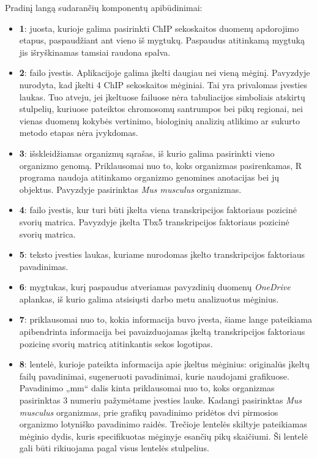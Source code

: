 \documentclass[12pt]{article}
\begin{document}
Pradinį langą sudarančių komponentų apibūdinimai:
\begin{itemize}
    \item \textbf{\large{1}}: juosta, kurioje galima pasirinkti ChIP
        sekoskaitos duomenų apdorojimo etapus, paspaudžiant ant vieno iš
        mygtukų. Paspaudus atitinkamą mygtuką jis išryškinamas tamsiai raudona
        spalva.
    \item \textbf{\large{2}}: failo įvestis. Aplikacijoje galima įkelti daugiau
        nei vieną mėginį. Pavyzdyje nurodyta, kad įkelti 4 ChIP sekoskaitos
        mėginiai. Tai yra privalomas įvesties laukas. Tuo atveju, jei
        įkeltuose failuose nėra tabuliacijos simboliais atskirtų stulpelių,
        kuriuose pateiktos chromosomų santrumpos bei pikų regionai, nei vienas
        duomenų kokybės vertinimo, biologinių analizių atlikimo ar sukurto
        metodo etapas nėra įvykdomas.
    \item \textbf{\large{3}}: išskleidžiamas organizmų sąrašas, iš kurio
        galima pasirinkti vieno organizmo genomą. Priklausomai nuo to, koks
        organizmas pasirenkamas, R programa naudoja atitinkamo organizmo
        genomines anotacijas bei jų objektus. Pavyzdyje pasirinktas
        \emph{Mus musculus} organizmas.
    \item \textbf{\large{4}}: failo įvestis, kur turi būti įkelta viena
        transkripcijos faktoriaus pozicinė svorių matrica. Pavyzdyje įkelta
        Tbx5 transkripcijos faktoriaus pozicinė svorių matrica.
    \item \textbf{\large{5}}: teksto įvesties laukas, kuriame nurodomas
        įkelto transkripcijos faktoriaus pavadinimas.
    \item \textbf{\large{6}}: mygtukas, kurį paspaudus atveriamas pavyzdinių
        duomenų \emph{OneDrive} aplankas, iš kurio galima atsisiųsti darbo
        metu analizuotus mėginius.
    \item \textbf{\large{7}}: priklausomai nuo to, kokia informacija buvo
        įvesta, šiame lange pateikiama apibendrinta informacija bei
        pavaizduojamas įkeltą transkripcijos faktoriaus pozicinę svorių
        matricą atitinkantis sekos logotipas.
    \item \textbf{\large{8}}: lentelė, kurioje pateikta informacija apie įkeltus
        mėginius: originalūs įkeltų failų pavadinimai, sugeneruoti pavadinimai,
        kurie naudojami grafikuose. Pavadinimo „mm“ dalis kinta priklausomai
        nuo to, koks organizmas pasirinktas 3 numeriu pažymėtame įvesties
        lauke. Kadangi pasirinktas \emph{Mus musculus} organizmas, prie grafikų
        pavadinimo pridėtos dvi pirmosios organizmo lotyniško pavadinimo raidės.
        Trečioje lentelės skiltyje pateikiamas mėginio dydis, kuris
        specifikuotas mėginyje esančių pikų skaičiumi. Ši lentelė gali būti
        rikiuojama pagal visus lentelės stulpelius.
\end{itemize}
\end{document}
